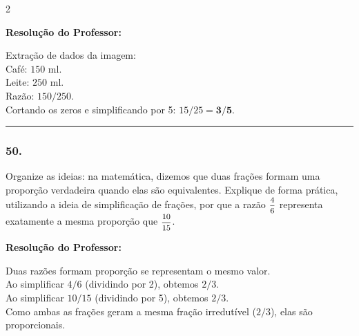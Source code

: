 \begin{multicols*}{2}
\ifgabarito
    \begin{tcolorbox}[colback=CorTitUm!5, colframe=CorTitUm, boxrule=1pt, arc=4pt, left=6pt, right=6pt, top=6pt, bottom=6pt]
    \small\textbf{\textcolor{CorTitUm}{Resolução do Professor:}}\par\vspace{0.1cm}
    \color{CinzaEscuro}
    Extração de dados da imagem:\\
    Café: $ 150 $ ml.\\
    Leite: $ 250 $ ml.\\
    Razão: $ 150/250 $.\\
    Cortando os zeros e simplificando por 5: $ 15/25 = \textbf{3/5} $.
    \end{tcolorbox}
\fi

\par\vspace{\espacoQuestao}

\noindent\textcolor{CorLinha}{\rule{\linewidth}{0.5pt}} 
\par\vspace{\espacoPreQuestao}
\subsubsection*{50.} Organize as ideias: na matemática, dizemos que duas frações formam uma proporção verdadeira quando elas são equivalentes. Explique de forma prática, utilizando a ideia de simplificação de frações, por que a razão $ \mfrac{4}{6} $ representa exatamente a mesma proporção que $ \mfrac{10}{15} $.

\ifgabarito
    \begin{tcolorbox}[colback=CorTitUm!5, colframe=CorTitUm, boxrule=1pt, arc=4pt, left=6pt, right=6pt, top=6pt, bottom=6pt]
    \small\textbf{\textcolor{CorTitUm}{Resolução do Professor:}}\par\vspace{0.1cm}
    \color{CinzaEscuro}
    Duas razões formam proporção se representam o mesmo valor.\\
    Ao simplificar $ 4/6 $ (dividindo por 2), obtemos $ 2/3 $.\\
    Ao simplificar $ 10/15 $ (dividindo por 5), obtemos $ 2/3 $.\\
    Como ambas as frações geram a mesma fração irredutível ($ 2/3 $), elas são proporcionais.
    \end{tcolorbox}
\fi

\par\vspace{\espacoQuestao}


\end{multicols*}
